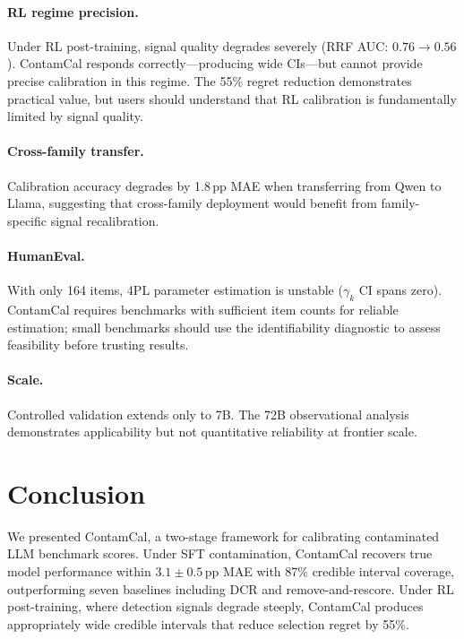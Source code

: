 \documentclass[letterpaper]{article}
\begin{document}
\paragraph{RL regime precision.}
Under RL post-training, signal quality degrades severely (RRF AUC: $0.76 \to 0.56$).
ContamCal responds correctly---producing wide CIs---but cannot provide precise calibration in this regime.
The 55\% regret reduction demonstrates practical value, but users should understand that RL calibration is fundamentally limited by signal quality.

\paragraph{Cross-family transfer.}
Calibration accuracy degrades by 1.8\,pp MAE when transferring from Qwen to Llama, suggesting that cross-family deployment would benefit from family-specific signal recalibration.

\paragraph{HumanEval.}
With only 164 items, 4PL parameter estimation is unstable ($\gamma_k$ CI spans zero).
ContamCal requires benchmarks with sufficient item counts for reliable estimation; small benchmarks should use the identifiability diagnostic to assess feasibility before trusting results.

\paragraph{Scale.}
Controlled validation extends only to 7B.
The 72B observational analysis demonstrates applicability but not quantitative reliability at frontier scale.

\section{Conclusion}
\label{sec:conclusion}

We presented ContamCal, a two-stage framework for calibrating contaminated LLM benchmark scores.
Under SFT contamination, ContamCal recovers true model performance within $3.1{\pm}0.5$\,pp MAE with 87\% credible interval coverage, outperforming seven baselines including DCR and remove-and-rescore.
Under RL post-training, where detection signals degrade steeply, ContamCal produces appropriately wide credible intervals that reduce selection regret by 55\%.
\end{document}
